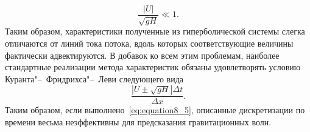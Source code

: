 %
\begin{equation}
\label{eq:equation8_5}
\frac{|U|}{\sqrt{gH}} \ll 1.
\end{equation}
%
Таким образом, характеристики полученные из гиперболической системы слегка отличаются от линий тока потока, вдоль которых соответствующие величины фактически адвектируются. В добавок ко всем этим проблемам, наиболее стандартные реализации метода характеристик обязаны удовлетворять условию Куранта"--~Фридрихса"--~Леви следующего вида
%
\begin{equation}
\label{eq:equation8_6}
\frac{|U\pm\sqrt{gH}|\Delta t}{\Delta x}.
\end{equation}
%
Таким образом, если выполнено~\eqref{eq:equation8_5}, описанные дискретизации по времени весьма неэффективны для предсказания гравитационных волн.

